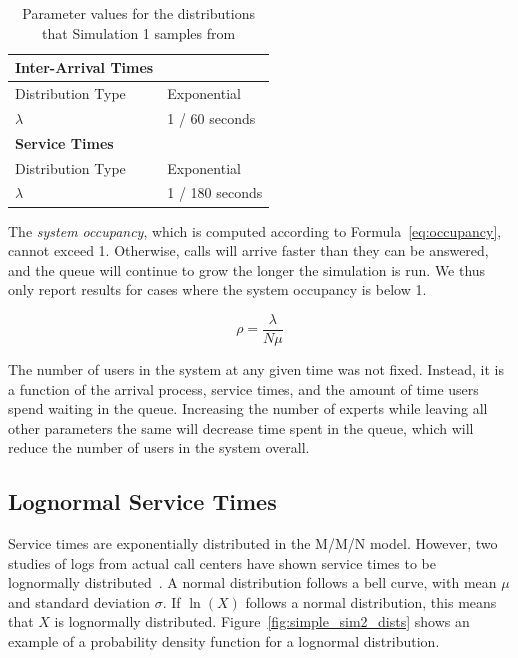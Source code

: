 \begin{table}
  \begin{tabular}{|l|l|}
    \hline
    \textbf{Inter-Arrival Times} & \\
    \hline
    Distribution Type & Exponential\\
    \hline
    $\lambda$ & 1 / 60 seconds\\
    \hline
    \hline
    \textbf{Service Times} & \\
    \hline
    Distribution Type & Exponential\\
    \hline
    $\lambda$ & 1 / 180 seconds\\
    \hline
  \end{tabular}
  \vspace{-0.1in}
  \caption{
    Parameter values for the distributions that Simulation 1 samples from
  }\label{tab:sim1_params}
  \vspace{-0.3in}
\end{table}

The \emph{system occupancy}, which is computed according to
Formula~\ref{eq:occupancy}, cannot exceed 1.
Otherwise, calls will arrive faster than they can be answered, and the queue
will continue to grow the longer the simulation is run.
We thus only report results for cases where the system occupancy is below 1.

\begin{equation}
\rho = \frac{\lambda}{N \mu}
\label{eq:occupancy}
\end{equation}

The number of users in the system at any given time was not fixed.
Instead, it is a function of the arrival process, service times, and the amount
of time users spend waiting in the queue.
Increasing the number of experts while leaving all other parameters the same
will decrease time spent in the queue, which will reduce the number of users in
the system overall.

\subsection{Lognormal Service Times}\label{sec:sim_lognormal}

Service times are exponentially distributed in the M/M/N model.
However, two studies of logs from actual call centers have shown service times
to be lognormally distributed~\cite{queue1, queue2}.
A normal distribution follows a bell curve, with mean $\mu$ and standard
deviation $\sigma$.
If $\ln{(X)}$ follows a normal distribution, this means that $X$ is lognormally
distributed.
Figure~\ref{fig:simple_sim2_dists} shows an example of a probability density
function for a lognormal distribution.

